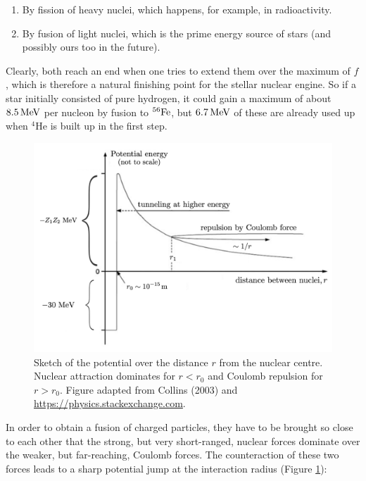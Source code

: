 \documentclass[a4paper,10pt]{article}
\begin{document}
\begin{enumerate}
    \item By fission of heavy nuclei, which happens, for example, in radioactivity.
    \item By fusion of light nuclei, which is the prime energy source of stars (and possibly ours too in the future).
\end{enumerate}

{\noindent}Clearly, both reach an end when one tries to extend them over the maximum of $f$, which is therefore a natural finishing point for the stellar nuclear engine. So if a star initially consisted of pure hydrogen, it could gain a maximum of about $8.5\,{\rm MeV}$ per nucleon by fusion to $^{56}{\rm Fe}$, but $6.7\,{\rm MeV}$ of these are already used up when $^4$He is built up in the first step.

\begin{figure}[t]
    \centering
    \includegraphics[width=14cm]{figures/CoulombBarrier.png}
    \caption{\footnotesize{Sketch of the potential over the distance $r$ from the nuclear centre. Nuclear attraction dominates for $r<r_0$ and Coulomb repulsion for $r>r_0$. Figure adapted from Collins (2003) and \href{https://physics.stackexchange.com}{https://physics.stackexchange.com}.}}
    \label{fig:coulombbarrier}
\end{figure}

{\noindent}In order to obtain a fusion of charged particles, they have to be brought so close to each other that the strong, but very short-ranged, nuclear forces dominate over the weaker, but far-reaching, Coulomb forces. The counteraction of these two forces leads to a sharp potential jump at the interaction radius (Figure \ref{fig:coulombbarrier}):
\end{document}
